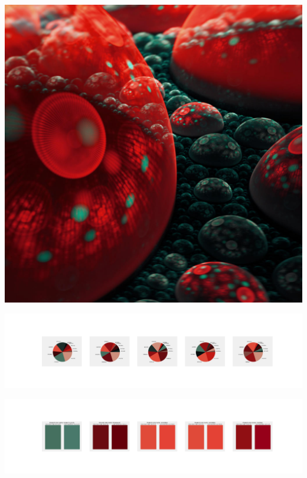 \documentclass[11pt]{article}
\begin{document}
\begin{landscape}
    \begin{center}
    \includegraphics[width=\textwidth]{./nbimg/file (276).jpg}
    \end{center}

    \begin{center}
    \includegraphics[width=250mm]{./nbimg/pie-196.jpg}
    \end{center}

    \begin{center}
    \includegraphics[width=250mm]{./nbimg/peak-196.jpg}
    \end{center}
    


\end{landscape}
\end{document}
